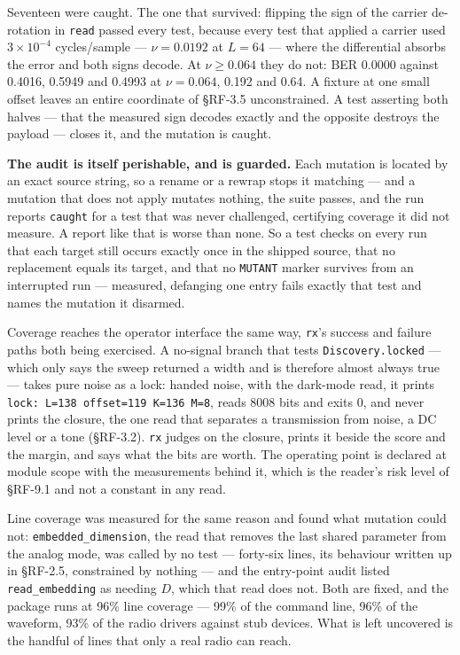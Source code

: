 \documentclass[10pt,letterpaper,twocolumn]{article}
\begin{document}
Seventeen were caught. The one that survived: flipping the sign of the carrier de-rotation in \texttt{read} passed every test, because every test that applied a carrier used \(3\times10^{-4}\) cycles/sample --- \(\nu = 0.0192\) at \(L=64\) --- where the differential absorbs the error and both signs decode. At \(\nu \ge 0.064\) they do not: BER 0.0000 against 0.4016, 0.5949 and 0.4993 at \(\nu = 0.064\), 0.192 and 0.64. A fixture at one small offset leaves an entire coordinate of §RF-3.5 unconstrained. A test asserting both halves --- that the measured sign decodes exactly and the opposite destroys the payload --- closes it, and the mutation is caught.

\textbf{The audit is itself perishable, and is guarded.} Each mutation is located by an exact source string, so a rename or a rewrap stops it matching --- and a mutation that does not apply mutates nothing, the suite passes, and the run reports \texttt{caught} for a test that was never challenged, certifying coverage it did not measure. A report like that is worse than none. So a test checks on every run that each target still occurs exactly once in the shipped source, that no replacement equals its target, and that no \texttt{MUTANT} marker survives from an interrupted run --- measured, defanging one entry fails exactly that test and names the mutation it disarmed.

Coverage reaches the operator interface the same way, \texttt{rx}'s success and failure paths both being exercised. A no-signal branch that tests \texttt{Discovery.\allowbreak{}locked} --- which only says the sweep returned a width and is therefore almost always true --- takes pure noise as a lock: handed noise, with the dark-mode read, it prints \texttt{lock:\allowbreak{}\ L=\allowbreak{}138\ offset=\allowbreak{}119\ K=\allowbreak{}136\ M=\allowbreak{}8}, reads 8008 bits and exits 0, and never prints the closure, the one read that separates a transmission from noise, a DC level or a tone (§RF-3.2). \texttt{rx} judges on the closure, prints it beside the score and the margin, and says what the bits are worth. The operating point is declared at module scope with the measurements behind it, which is the reader's risk level of §RF-9.1 and not a constant in any read.

Line coverage was measured for the same reason and found what mutation could not: \texttt{embedded\_\allowbreak{}dimension}, the read that removes the last shared parameter from the analog mode, was called by no test --- forty-six lines, its behaviour written up in §RF-2.5, constrained by nothing --- and the entry-point audit listed \texttt{read\_\allowbreak{}embedding} as needing \(D\), which that read does not. Both are fixed, and the package runs at 96\% line coverage --- 99\% of the command line, 96\% of the waveform, 93\% of the radio drivers against stub devices. What is left uncovered is the handful of lines that only a real radio can reach.
\end{document}
